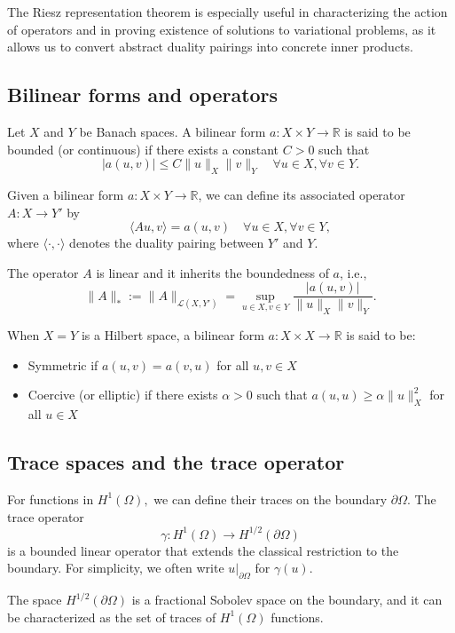 The Riesz representation theorem is especially useful in characterizing the action of operators and in proving existence of solutions to variational problems, as it allows us to convert abstract duality pairings into concrete inner products.

\subsection{Bilinear forms and operators}

Let $X$ and $Y$ be Banach spaces. A bilinear form $a: X \times Y \to \mathbb{R}$ is said to be bounded (or continuous) if there exists a constant $C > 0$ such that
\[
|a(u, v)| \leq C \|u\|_X \|v\|_Y \quad \forall u \in X, \forall v \in Y.
\]

Given a bilinear form $a: X \times Y \to \mathbb{R}$, we can define its associated operator $A: X \to Y'$ by
\[
\langle Au, v \rangle = a(u, v) \quad \forall u \in X, \forall v \in Y,
\]
where $\langle \cdot, \cdot \rangle$ denotes the duality pairing between $Y'$ and $Y$.

The operator $A$ is linear and it inherits the boundedness of $a$, i.e.,
\[ 
  \|A\|_* := \|A\|_{\mathcal{L}(X,Y')} = \sup\limits_{u \in X, v \in Y} \frac{|a(u,v)|}{\|u\|_X \|v\|_Y}.
\]

When $X = Y$ is a Hilbert space, a bilinear form $a: X \times X \to \mathbb{R}$ is said to be:
\begin{itemize}
  \item Symmetric if $a(u, v) = a(v, u)$ for all $u, v \in X$
  \item Coercive (or elliptic) if there exists $\alpha > 0$ such that $a(u, u) \geq \alpha \|u\|_X^2$ for all $u \in X$
\end{itemize}

\subsection{Trace spaces and the trace operator}

For functions in $H^1(\Omega),$ we can define their traces on the boundary $\partial\Omega$. The trace operator 
\[
\gamma: H^1(\Omega) \to H^{1/2}(\partial\Omega)
\]
is a bounded linear operator that extends the classical restriction to the boundary. For simplicity, we often write $u|_{\partial\Omega}$ for $\gamma(u)$.

The space $H^{1/2}(\partial\Omega)$ is a fractional Sobolev space on the boundary, and it can be characterized as the set of traces of $H^1(\Omega)$ functions.

